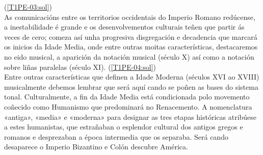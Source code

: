 %
    {%
    (\ref{T1PE-03:sol}) {\color{orange}{\hrulefill}}
    \\ \small{%
    As comunicacións entre os territorios occidentais do Imperio Romano redúcense, a inestabilidade é grande e os desenvolvementos culturais teñen que partir ás veces de cero; comeza así unha progresiva disgregación e decadencia que marcará os inicios da Idade Media, onde entre outras moitas características, destacaremos no eido musical, a aparición da notación musical (século X) así como a notación sobre liñas paralelas (século XI). 
    {\color{orange}{\hrulefill}}
    }
    }
%
%
    {%
    (\ref{T1PE-04:sol}) {\color{orange}{\hrulefill}}
    \\ \small{%
    Entre outras características que definen a Idade Moderna (séculos XVI ao XVIII) musicalmente debemos lembrar que será aquí cando se poñen as bases do sistema tonal.  Culturalmente, a fin da Idade Media está condicionada polo movemento coñecido como Humanismo que predominará no Renacemento. A nomenclatura «antiga», «media» e «moderna» para designar as tres etapas históricas atribúese a estes humanistas, que estrañaban o esplendor cultural dos antigos gregos e romanos e desprezaban a época intermedia que os separaba. Será cando desaparece o Imperio Bizantino e Colón descubre América. 
    {\color{orange}{\hrulefill}}
    }
    }
%
